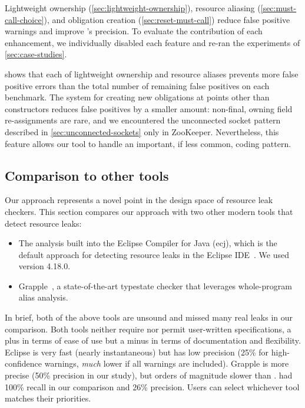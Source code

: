Lightweight ownership (\cref{sec:lightweight-ownership}),
resource aliasing (\cref{sec:must-call-choice}), and
obligation creation (\cref{sec:reset-must-call})
reduce false positive warnings and improve \tool's precision.
To evaluate the contribution of each enhancement, we individually disabled each
feature and re-ran the experiments of \cref{sec:case-studies}.

 shows that each of lightweight
ownership and resource aliases prevents more false positive errors than the total number
of remaining false positives on each benchmark.
The system for creating new obligations at points other than constructors reduces
false positives by a smaller amount: non-final, owning field re-assignments are rare,
and we encountered the unconnected socket pattern described in \cref{sec:unconnected-sockets}
only in ZooKeeper. Nevertheless, this feature allows our tool to handle an
important, if less common, coding pattern.

\subsection{Comparison to other tools}
\label{sec:compare}

Our approach represents a novel point in the design space of resource leak checkers.
%
This section compares our approach with two other modern tools that detect resource leaks:
\begin{itemize}
\item The analysis built into the Eclipse Compiler for Java (ecj), which is the default approach
  for detecting resource leaks in the Eclipse IDE~\cite{ecj-resource-leak}.
  We used version 4.18.0.
\item Grapple~\cite{zuo2019grapple}, a state-of-the-art typestate checker that
leverages whole-program alias analysis.
\end{itemize}
In brief, both of the above tools are unsound and missed many real leaks in our
comparison.  Both tools neither require nor permit user-written specifications,
a plus in terms of ease of use but a minus in terms of documentation and
flexibility. Eclipse is very fast (nearly instantaneous) but has low precision
(25\% for high-confidence warnings, \emph{much} lower if all warnings are
included). Grapple is more precise (50\% precision in our study), but orders of
magnitude slower than \tool.  \tool had 100\% recall in our comparison and 26\%
precision.  Users can select whichever tool matches their priorities.

